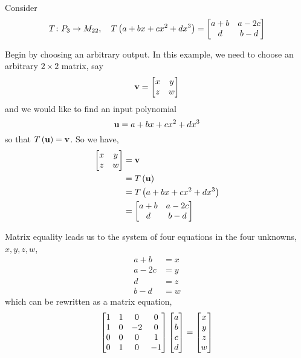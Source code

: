 \documentclass{ximera}
\begin{document}
\begin{example}
Consider
\[T\colon P_3\rightarrow M_{22},\quad T\left(a+bx+cx^2+dx^3\right)=
\begin{bmatrix}
a+b & a-2c\\
d & b-d
\end{bmatrix}
\]

Begin by choosing an arbitrary output.  In this example, we need to choose an arbitrary $2\times 2$ matrix, say
\[
\mathbf{v}=\begin{bmatrix}x&y\\z&w\end{bmatrix}
\]
and we would like to find an input polynomial
\[
\mathbf{u}=a+bx+cx^2+dx^3
\]
so that $T\left(\mathbf{u}\right)=\mathbf{v}$.  So we have,
\begin{align*}
\begin{bmatrix}x&y\\z&w\end{bmatrix}&=\mathbf{v}\\
&=T\left(\mathbf{u}\right)\\
&=T\left(a+bx+cx^2+dx^3\right)\\
&=\begin{bmatrix}
a+b & a-2c\\
d & b-d
\end{bmatrix}
\end{align*}




Matrix equality leads us to the system of four equations in the four unknowns, $x,y,z,w$,
\begin{align*}
a+b&=x\\
a-2c&=y\\
d&=z\\
b-d&=w
\end{align*}
which can be rewritten as a matrix equation,
\[
\begin{bmatrix}
1 & 1 & 0 & 0\\
1 & 0 & -2 & 0 \\
0 & 0 & 0 & 1\\
0 & 1 & 0 & -1
\end{bmatrix}
\begin{bmatrix}a\\b\\c\\d\end{bmatrix}
=
\begin{bmatrix}x\\y\\z\\w\end{bmatrix}
\]





\end{example}
\end{document}
